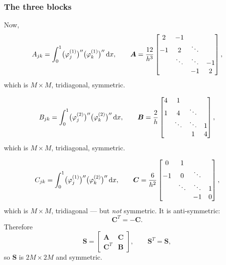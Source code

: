 \subsubsection*{The three blocks}

\medskip\noindent
Now,
\begin{equation}\label{eq:l12Ajk}
  A_{jk}=\int_0^1\bigl(\varphi_{j}^{(1)}\bigr)''\bigl(\varphi_{k}^{(1)}\bigr)''\,\mathrm{d} x,
  \qquad
  \bm{A}=\frac{12}{h^{3}}
  \begin{bmatrix}
    2 & -1 &        &    \\
   -1 &  2 & \ddots &    \\
      & \ddots & \ddots & -1\\
      &    & -1 & 2
  \end{bmatrix},
\end{equation}
which is $M\times M$, tridiagonal, symmetric.

\begin{equation}\label{eq:l12Bjk}
  B_{jk}=\int_0^1\bigl(\varphi_{j}^{(2)}\bigr)''\bigl(\varphi_{k}^{(2)}\bigr)''\,\mathrm{d} x,
  \qquad
  \bm{B}=\frac{2}{h}
  \begin{bmatrix}
    4 & 1 &        &   \\
    1 & 4 & \ddots &   \\
      & \ddots & \ddots & 1\\
      &   & 1 & 4
  \end{bmatrix},
\end{equation}
which is $M\times M$, tridiagonal, symmetric.

\begin{equation}\label{eq:l12Cjk}
  C_{jk}=\int_0^1\bigl(\varphi_{j}^{(1)}\bigr)''\bigl(\varphi_{k}^{(2)}\bigr)''\,\mathrm{d} x,
  \qquad
  \bm{C}=\frac{6}{h^{2}}
  \begin{bmatrix}
    0 & 1 &        &   \\
   -1 & 0 & \ddots &   \\
      & \ddots & \ddots & 1\\
      &   & -1 & 0
  \end{bmatrix},
\end{equation}
which is $M\times M$, tridiagonal --- but \emph{not} symmetric. It is
anti-symmetric:
\begin{equation}\label{eq:l12anti}
  \bm{C}^{T}=-\bm{C}.
\end{equation}
Therefore
\begin{equation}\label{eq:l12S}
  \bm{S}=\left[\begin{array}{c|c}
    \bm{A} & \bm{C}\\\hline
    \bm{C}^{T} & \bm{B}
  \end{array}\right],
  \qquad \bm{S}^{T}=\bm{S},
\end{equation}
so $\bm{S}$ is $2M\times2M$ and symmetric.

